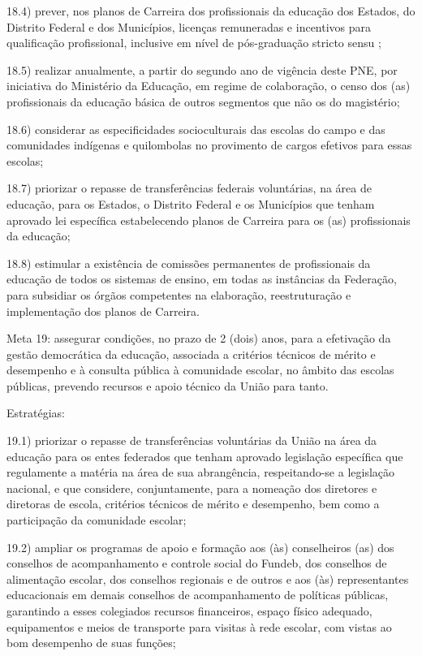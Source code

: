 \documentclass[
]{book}
\begin{document}
18.4) prever, nos planos de Carreira dos profissionais da educação dos Estados, do Distrito Federal e dos Municípios, licenças remuneradas e incentivos para qualificação profissional, inclusive em nível de pós-graduação stricto sensu ;

18.5) realizar anualmente, a partir do segundo ano de vigência deste PNE, por iniciativa do Ministério da Educação, em regime de colaboração, o censo dos (as) profissionais da educação básica de outros segmentos que não os do magistério;

18.6) considerar as especificidades socioculturais das escolas do campo e das comunidades indígenas e quilombolas no provimento de cargos efetivos para essas escolas;

18.7) priorizar o repasse de transferências federais voluntárias, na área de educação, para os Estados, o Distrito Federal e os Municípios que tenham aprovado lei específica estabelecendo planos de Carreira para os (as) profissionais da educação;

18.8) estimular a existência de comissões permanentes de profissionais da educação de todos os sistemas de ensino, em todas as instâncias da Federação, para subsidiar os órgãos competentes na elaboração, reestruturação e implementação dos planos de Carreira.

Meta 19: assegurar condições, no prazo de 2 (dois) anos, para a efetivação da gestão democrática da educação, associada a critérios técnicos de mérito e desempenho e à consulta pública à comunidade escolar, no âmbito das escolas públicas, prevendo recursos e apoio técnico da União para tanto.

Estratégias:

19.1) priorizar o repasse de transferências voluntárias da União na área da educação para os entes federados que tenham aprovado legislação específica que regulamente a matéria na área de sua abrangência, respeitando-se a legislação nacional, e que considere, conjuntamente, para a nomeação dos diretores e diretoras de escola, critérios técnicos de mérito e desempenho, bem como a participação da comunidade escolar;

19.2) ampliar os programas de apoio e formação aos (às) conselheiros (as) dos conselhos de acompanhamento e controle social do Fundeb, dos conselhos de alimentação escolar, dos conselhos regionais e de outros e aos (às) representantes educacionais em demais conselhos de acompanhamento de políticas públicas, garantindo a esses colegiados recursos financeiros, espaço físico adequado, equipamentos e meios de transporte para visitas à rede escolar, com vistas ao bom desempenho de suas funções;
\end{document}
